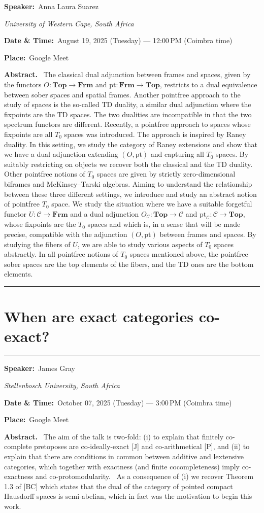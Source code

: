 \documentclass[11pt,a4paper]{article}
\newcommand{\Title}[1]{\section*{#1}\vspace{-0.25em}\hrule\vspace{0.8em}}
\newcommand{\Field}[2]{\textbf{#1:}~#2\par}
\newcommand{\Affil}[1]{\textit{#1}\par}
\newcommand{\Abstract}{\vspace{0.6em}\textbf{Abstract.}~}
\newcommand{\TalkBlockSep}{\vspace{1.25em}\hrule\vspace{1.25em}}
\begin{document}
\Field{Speaker}{Anna Laura Suarez}
\Affil{University of Western Cape, South Africa}

\Field{Date \& Time}{August 19, 2025 (Tuesday) — 12{:}00\,PM (Coimbra time)}
\Field{Place}{Google Meet}

\Abstract
The classical dual adjunction between frames and spaces, given by the functors
$O\colon \mathbf{Top} \to \mathbf{Frm}$ and $\mathrm{pt}\colon \mathbf{Frm} \to \mathbf{Top}$, restricts to a dual equivalence between sober spaces
and spatial frames. Another pointfree approach to the study of spaces is the so-called TD
duality, a similar dual adjunction where the fixpoints are the TD spaces. The two dualities are
incompatible in that the two spectrum functors are different. Recently, a pointfree approach
to spaces whose fixpoints are all $T_0$ spaces was introduced. The approach is inspired by Raney
duality. In this setting, we study the category of Raney extensions and show that we have a dual
adjunction extending $(O,\mathrm{pt})$ and capturing all $T_0$ spaces. By suitably restricting on objects we
recover both the classical and the TD duality. Other pointfree notions of $T_0$ spaces are given
by strictly zero-dimensional biframes and McKinsey--Tarski algebras. Aiming to understand
the relationship between these three different settings, we introduce and study an abstract
notion of pointfree $T_0$ space. We study the situation where we have a suitable forgetful functor
$U \colon \mathcal{C} \to \mathbf{Frm}$ and a dual adjunction $O_{\mathcal C}\colon \mathbf{Top} \to \mathcal C$ and $\mathrm{pt}_{\mathcal C}\colon \mathcal C \to \mathbf{Top}$, whose fixpoints are the
$T_0$ spaces and which is, in a sense that will be made precise, compatible with the adjunction
$(O,\mathrm{pt})$ between frames and spaces. By studying the fibers of $U$, we are able to study various
aspects of $T_0$ spaces abstractly. In all pointfree notions of $T_0$ spaces mentioned above, the
pointfree sober spaces are the top elements of the fibers, and the TD ones are the bottom
elements.
\TalkBlockSep
\Title{When are exact categories co-exact?}

\Field{Speaker}{James Gray}
\Affil{Stellenbosch University, South Africa}

\Field{Date \& Time}{October 07, 2025 (Tuesday) — 3{:}00\,PM (Coimbra time)}
\Field{Place}{Google Meet}

\Abstract
The aim of the talk is two-fold: (i) to explain that finitely co-complete
pretoposes are co-ideally-exact [J] and co-arithmetical [P], and (ii)
to explain that there are conditions in common between additive and
lextensive categories, which together with exactness (and finite
cocompleteness) imply co-exactness and co-protomodularity.  As
a consequence of (i) we recover Theorem 1.3 of [BC] which states that
the dual of the category of pointed compact Hausdorff spaces is
semi-abelian, which in fact was the motivation to begin this work.\\
\\
\end{document}
